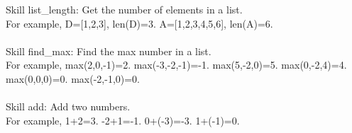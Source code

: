 \documentclass{article} \usepackage{arxiv}
\begin{document}
\newpage


\begin{tcolorbox}[title = {Skills for Dynamic Programming}, colback = Apricot!25!white, colframe = BrickRed!75!black] 
Skill list\_length: Get the number of elements in a list.  \\
For example, D=[1,2,3], len(D)=3. A=[1,2,3,4,5,6], len(A)=6. \\ \\

Skill find\_max: Find the max number in a list. \\
For example, max(2,0,-1)=2. max(-3,-2,-1)=-1. max(5,-2,0)=5. max(0,-2,4)=4.  max(0,0,0)=0. max(-2,-1,0)=0. \\ \\

Skill add: Add two numbers. \\
For example, 1+2=3. -2+1=-1. 0+(-3)=-3. 1+(-1)=0. \\
\end{tcolorbox}
\noindent\begin{minipage}{\textwidth}
 \label{Tab:dp_skill}
\end{minipage}

\newpage
\end{document}
